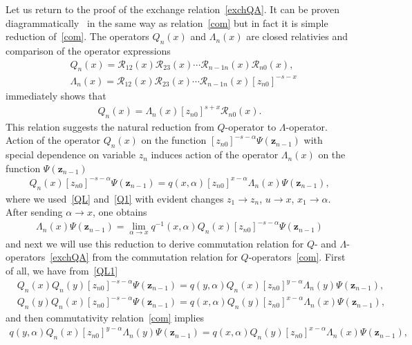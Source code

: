 \documentclass[10pt,a4paper]{amsart}
\numberwithin{equation}{section}
\begin{document}
Let us return to the proof of the exchange relation~\eqref{exchQA}.
It can be proven diagrammatically~\cite{DKO, DKM,DM2} in the same
way as relation~\eqref{com} but in fact it is simple
reduction of~\eqref{com}.
The operators $Q_n(x)$ and $\Lambda_n(x)$ are closed relativies and comparison of the operator expressions%
\begin{align*}
&Q_n( x) = \mathcal{R}_{12}(x)\mathcal{R}_{23}(x)\cdots
\mathcal{R}_{n-1 n}(x) \mathcal{R}_{n 0}(x) , \\
&\Lambda_n( x) = \mathcal{R}_{12}(x)\mathcal{R}_{23}(x)\cdots
\mathcal{R}_{n-1 n}(x) [z_{n0}]^{-s-x}
\end{align*}
immediately shows that
\begin{align}\label{QL}
Q_n( x) = \Lambda_n(x) [z_{n0}]^{s+x} \mathcal{R}_{n 0}(x) .
\end{align}
This relation suggests the natural reduction from $Q$-operator to $\Lambda$-operator.
Action of the operator $Q_n( x)$ on the function
$[z_{n 0}]^{-s-\alpha} \Psi(\bm z_{n-1})$ with special
dependence on variable $z_n$ induces action
of the operator $\Lambda_n( x)$ on
the function $\Psi(\bm z_{n-1})$
\begin{align}\label{QL1}
Q_n( x) [z_{n 0}]^{-s-\alpha} \Psi(\bm z_{n-1}) =
q(x,\alpha) [z_{n0}]^{x-\alpha}
\Lambda_n( x) \Psi(\bm z_{n-1}),
\end{align}
where we used~\eqref{QL} and~\eqref{Q1} with evident changes
$z_1 \to z_n$, $u \to x$, $x_1 \to \alpha$.
After sending $\alpha \to x$, one obtains
\begin{align}\label{RedQL}
\Lambda_n( x) \Psi(\bm z_{n-1}) =
\lim\limits_{\alpha\to x} q^{-1}(x,\alpha) Q_n( x) [z_{n 0}]^{-s-\alpha} \Psi(\bm z_{n-1})
\end{align}
and next we will use this reduction to derive commutation
relation for $Q$- and $\Lambda$-operators~\eqref{exchQA} from
the commutation relation for $Q$-operators~\eqref{com}.
First of all, we have from~\eqref{QL1}
\begin{align*}
&Q_n( x) Q_n( y) [z_{n 0}]^{-s-\alpha} \Psi(\bm z_{n-1}) =
q(y,\alpha) Q_n( x) [z_{n 0}]^{y-\alpha} \Lambda_n(y) \Psi(\bm z_{n-1}) ,\\
&Q_n( y) Q_n( x) [z_{n 0}]^{-s-\alpha} \Psi(\bm z_{n-1}) =
q(x,\alpha) Q_n( y) [z_{n 0}]^{x-\alpha} \Lambda_n(x) \Psi(\bm z_{n-1}) ,
\end{align*}
and then commutativity relation~\eqref{com} implies
\begin{align*}
q(y,\alpha) Q_n( x) [z_{n 0}]^{y-\alpha} \Lambda_n(y) \Psi(\bm z_{n-1}) =
q(x,\alpha) Q_n( y) [z_{n 0}]^{x-\alpha} \Lambda_n(x) \Psi(\bm z_{n-1}) ,
\end{align*}
\end{document}
